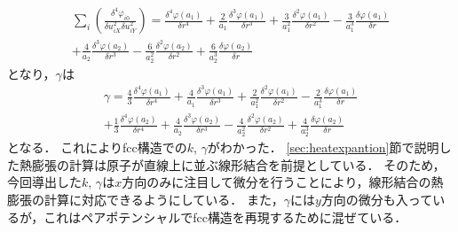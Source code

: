 \begin{eqnarray}
\label{eq:moment23}
\sum_i \left(\frac{\delta^4\varphi_{i0}}{\delta u_{iX}^2\delta u_{iY}^2}\right)=
\frac{\delta^4 \varphi(a_1)}{\delta r^4}
+\frac{2}{a_1}\frac{\delta^3 \varphi(a_1)}{\delta r^3}
+\frac{3}{a_1^2}\frac{\delta^2 \varphi(a_1)}{\delta r^2}
-\frac{3}{a_1^3}\frac{\delta \varphi(a_1)}{\delta r}\nonumber\\
+\frac{4}{a_2}\frac{\delta^3 \varphi(a_2)}{\delta r^3}
-\frac{6}{a_2^2}\frac{\delta^2 \varphi(a_2)}{\delta r^2}
+\frac{6}{a_2^3}\frac{\delta \varphi(a_2)}{\delta r}
\end{eqnarray}
となり，$\gamma$は
\begin{eqnarray}
\label{eq:gamma}
\gamma=
\frac{4}{3}\frac{\delta^4 \varphi(a_1)}{\delta r^4}
+\frac{4}{a_1}\frac{\delta^3 \varphi(a_1)}{\delta r^3}
+\frac{2}{a_1^2}\frac{\delta^2 \varphi(a_1)}{\delta r^2}
-\frac{2}{a_1^3}\frac{\delta \varphi(a_1)}{\delta r}\nonumber\\
+\frac{1}{3}\frac{\delta^4 \varphi(a_2)}{\delta r^4}
+\frac{4}{a_2}\frac{\delta^3 \varphi(a_2)}{\delta r^3}
-\frac{4}{a_2^2}\frac{\delta^2 \varphi(a_2)}{\delta r^2}
+\frac{4}{a_2^3}\frac{\delta \varphi(a_2)}{\delta r}
\end{eqnarray}
となる．
これによりfcc構造での$k$, $\gamma$がわかった．
\ref{sec:heatexpantion}節で説明した熱膨張の計算は原子が直線上に並ぶ線形結合を前提としている．
そのため，今回導出した$k$, $\gamma$は$x$方向のみに注目して微分を行うことにより，線形結合の熱膨張の計算に対応できるようにしている．
また，$\gamma$には$y$方向の微分も入っているが，これはペアポテンシャルでfcc構造を再現するために混ぜている．


